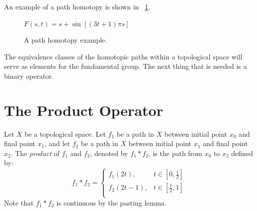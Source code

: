 \documentclass[letterpaper,12pt,fleqn]{article}
\begin{document}
An example of a path homotopy is shown in \figurename\ \ref{fig:path}.

\begin{figure}[H]
  \centering

  \bigskip

  \(F(s,t)=s+\sin[(3t+1)\pi s]\)
  \caption{A path homotopy example.}
  \label{fig:path}
\end{figure}

The equivalence classes of the homotopic paths within a topological space will serve as elements for the
fundamental group.  The next thing that is needed is a binary operator.

\section*{The Product Operator}

Let \(X\) be a topological space.  Let \(f_1\) be a path in \(X\) between initial point \(x_0\) and final point
\(x_1\), and let \(f_2\) be a path in \(X\) between initial point \(x_1\) and final point \(x_2\).  The
\emph{product} of \(f_1\) and \(f_2\), denoted by \(f_1*f_2\), is the path from \(x_0\) to \(x_2\) defined by:
\[f_1*f_2=\begin{cases}
f_1(2t), & t\in\left[0,\frac{1}{2}\right] \\
f_2(2t-1), & t\in\left[\frac{1}{2},1\right] \\
\end{cases}\]
Note that \(f_1*f_2\) is continuous by the pasting lemma.
\end{document}
